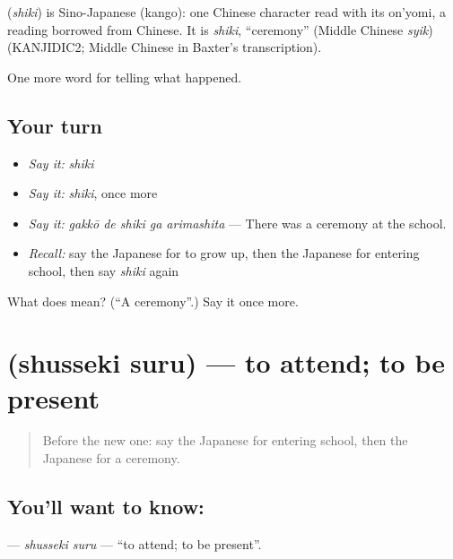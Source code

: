 \begin{cousinweb}
\textbf{} (\emph{shiki}) is Sino-Japanese (kango): one Chinese character read with its on'yomi, a reading borrowed from Chinese. It is \emph{shiki}, \textquotedblleft{}ceremony\textquotedblright{} (Middle Chinese \emph{syik}) (KANJIDIC2; Middle Chinese in Baxter's transcription).
\end{cousinweb}

\begin{grammarlens}[title={What you've built}]
One more word for telling what happened.
\end{grammarlens}

\subsection*{Your turn}
\begin{itemize}
\raggedright
  \item \emph{Say it:} \emph{shiki}
  \item \emph{Say it:} \emph{shiki}, once more
  \item \emph{Say it:} \emph{gakkō de shiki ga arimashita} — There was a ceremony at the school.
  \item \emph{Recall:} say the Japanese for to grow up, then the Japanese for entering school, then say \emph{shiki} again
\end{itemize}

\begin{tcolorbox}[breakable,colback=teal!4,colframe=teal!35!black,title={Before you move on}]
What does  mean? (\textquotedblleft{}A ceremony\textquotedblright{}.) Say it once more.
\end{tcolorbox}
\section[\texorpdfstring{\ja{しゅっせきする} (shusseki suru)}{しゅっせきする (shusseki suru)}]{ (shusseki suru) — to attend; to be present}

\label{lesson:JA-C288-shusseki-suru}



\begin{quote}
Before the new one: say the Japanese for entering school, then the Japanese for a ceremony.
\end{quote}

\subsection*{You'll want to know: }
\textbf{} — \emph{shusseki suru} — \textquotedblleft{}to attend; to be present\textquotedblright{}.

